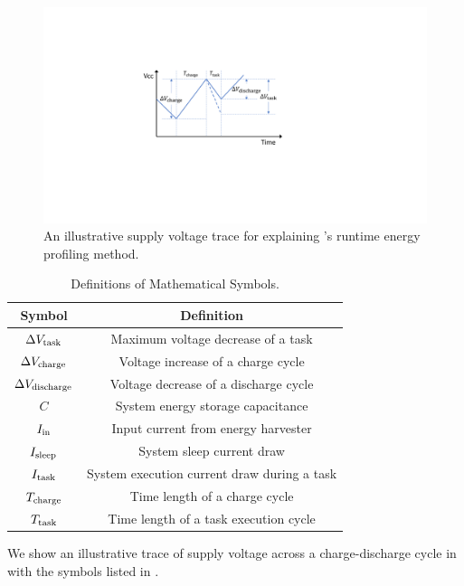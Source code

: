 \begin{figure}
    \centering
    \includegraphics[width=0.9\columnwidth]{ch5_optic/figures/temp.pdf}
    \caption{An illustrative supply voltage trace for explaining \nn{}'s runtime energy profiling method. }
    \label{fig:math}
\end{figure}

\begin{table}
    \renewcommand{\arraystretch}{1.2}
    \centering
    \begin{tabular}{|c|c|}
    \hline
    \textbf{Symbol} & \textbf{Definition} \\
    \hline
    $\Delta V_{\text{task}}$ & Maximum voltage decrease of a task \\
    $\Delta V_{\text{charge}}$ & Voltage increase of a charge cycle \\
    $\Delta V_{\text{discharge}}$ & Voltage decrease of a discharge cycle \\
    $C$ & System energy storage capacitance \\
    $I_{\text{in}}$ & Input current from energy harvester \\
    $I_{\text{sleep}}$ & System sleep current draw \\
    $I_{\text{task}}$ & System execution current draw during a task \\
    $T_{\text{charge}}$ & Time length of a charge cycle  \\
    $T_{\text{task}}$ & Time length of a task execution cycle  \\
    \hline
    \end{tabular}
    \caption{Definitions of Mathematical Symbols.}
    \label{tab:symbols}
\end{table}

We show an illustrative trace of supply voltage across a charge-discharge cycle in  with the symbols listed in . 

